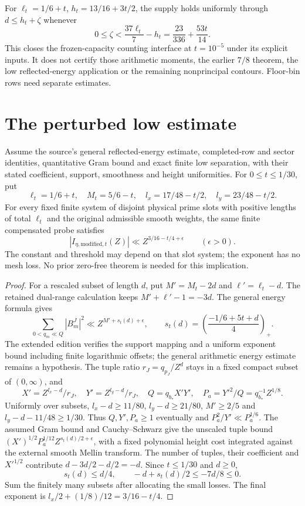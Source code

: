 For $\ell_t=1/6+t$, $h_t=13/16+3t/2$, the supply holds uniformly
through $d\le h_t+\zeta$ whenever
\[
 0\le\zeta<\frac{37\ell_t}{7}-h_t=\frac{23}{336}+\frac{53t}{14}.
\]
This closes the frozen-capacity counting interface at $t=10^{-5}$
under its explicit inputs. It does not certify those arithmetic moments,
the earlier $7/8$ theorem, the low reflected-energy application or the
remaining nonprincipal contours. Floor-bin rows need separate estimates.


\section{The perturbed low estimate}
\begin{proposition}\label{prop:low-energy}
Assume the source's general reflected-energy estimate, completed-row and
sector identities, quantitative Gram bound and exact finite low separation,
with their stated coefficient, support, smoothness and height uniformities.
For $0\le t\le1/30$, put
\[
 \ell_t=1/6+t,\quad M_t=5/6-t,\quad
 l_x=17/48-t/2,\quad l_y=23/48-t/2.
\]
For every fixed finite system of disjoint physical prime slots with
positive lengths of total $\ell_t$ and the original admissible smooth
weights, the same finite compensated probe satisfies
\[
 |I_{\eta,\mathrm{modified},t}(Z)|
 \ll Z^{3/16-t/4+\epsilon}\qquad(\epsilon>0).
\]
The constant and threshold may depend on that slot system; the exponent
has no mesh loss. No prior zero-free theorem is needed for this implication.
\end{proposition}
\begin{proof}
For a rescaled subset of length $d$, put $M'=M_t-2d$ and
$\ell'=\ell_t-d$. The retained dual-range calculation keeps
$M'+\ell'-1=-3d$. The general energy formula gives
\[
 \sum_{0<q_m\ll Q}|B^J_m|^2\ll Z^{M'+s_t(d)+\epsilon},\qquad
 s_t(d)=\left(\frac{-1/6+5t+d}{4}\right)_+.
\]
The extended edition verifies the support mapping and a uniform exponent
bound including finite logarithmic offsets; the general arithmetic energy
estimate remains a hypothesis. The tuple ratio $r_J=q_{p_J}/Z^d$ stays
in a fixed compact subset of $(0,\infty)$, and
\[
 X'=Z^{l_x-d}/r_J,\quad Y'=Z^{l_y-d}/r_J,\quad
 Q=q_{b_*}X'Y',\quad P_a=Y'^2/Q=q_{b_*}^{-1}Z^{1/8}.
\]
Uniformly over subsets, $l_x-d\ge11/80$, $l_y-d\ge21/80$,
$M'\ge2/5$ and $l_y-d-11/48\ge1/30$.
Thus $Q,Y',P_a\ge1$ eventually and $P_a^2/Y'\ll P_a^{1/6}$.
The assumed Gram bound and Cauchy--Schwarz give the unscaled tuple bound
$(X')^{1/2}P_a^{1/12}Z^{s_t(d)/2+\epsilon}$, with a fixed polynomial
height cost integrated against the external smooth Mellin transform.
The number of tuples, their coefficient and $X'^{1/2}$ contribute
$d-3d/2-d/2=-d$. Since $t\le1/30$ and $d\ge0$,
\[
 s_t(d)\le d/4,\qquad -d+s_t(d)/2\le-7d/8\le0.
\]
Sum the finitely many subsets after allocating the small losses. The final
exponent is $l_x/2+(1/8)/12=3/16-t/4$.
\end{proof}

